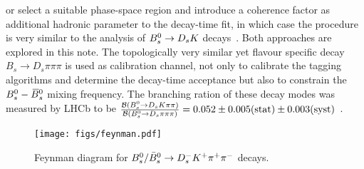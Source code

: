 or select a suitable phase-space region and introduce a coherence factor as additional hadronic parameter to the decay-time fit,
in which case the procedure is very similar to the analysis of ${{B}^0_{s}}\rightarrow{\ensuremath{{D}_{s}}}{\ensuremath{K}}$ decays~\cite{Battista:2196464,Aaij:2017lff}.
Both approaches are explored in this note.
The topologically very similar yet flavour specific decay $B_s \to D_s \pi\pi\pi$ is used as calibration channel,
not only to calibrate the tagging algorithms and determine the decay-time acceptance but also to constrain the ${{B}^0_{s}}-{{\kern 0.18em\overline{\kern -0.18em B}{}}{}^0_{s}}$ mixing frequency.
The branching ration of these decay modes was measured by LHCb to be 
$\frac{\mathcal B({{B}^0_{s}}\rightarrow{\ensuremath{{D}_{s}}}{\ensuremath{K}}\pi\pi)}{\mathcal B({{B}^0_{s}}\rightarrow{\ensuremath{{D}_{s}}}{\ensuremath{\pi}}\pi\pi)} = 0.052 \pm 0.005 (\text{stat}) \pm 0.003 (\text{syst})$~\cite{Blusk:1471393,Blusk:2012it}.\newline





\begin{figure}[h]
\centering
\texttt{[image: figs/feynman.pdf]}
\caption{Feynman diagram for $B_s^0/\bar B_s^0 \rightarrow D_s^- K^+ {{\pi}^+} {{\pi}^-}$ decays.}
\label{fig:decay_feynman}
\end{figure}


